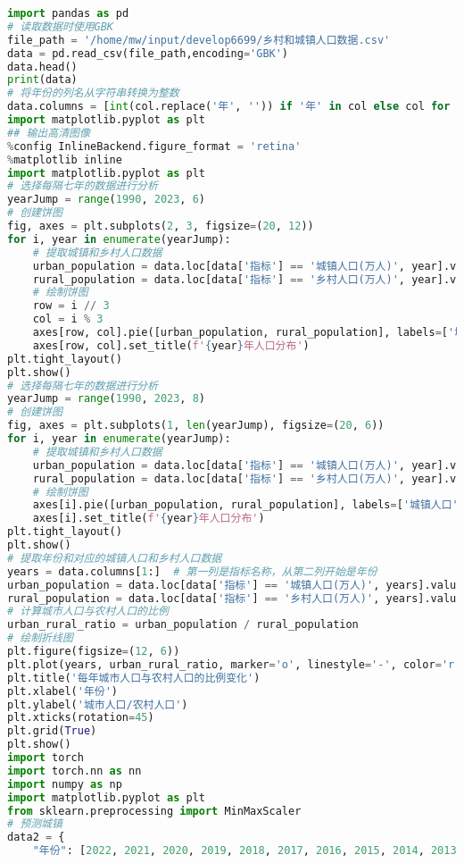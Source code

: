 \begin{lstlisting}[language=python,caption={城乡人口}]
import pandas as pd
# 读取数据时使用GBK
file_path = '/home/mw/input/develop6699/乡村和城镇人口数据.csv'
data = pd.read_csv(file_path,encoding='GBK')
data.head()
print(data)
# 将年份的列名从字符串转换为整数
data.columns = [int(col.replace('年', '')) if '年' in col else col for col in data.columns]
import matplotlib.pyplot as plt
## 输出高清图像
%config InlineBackend.figure_format = 'retina'
%matplotlib inline
import matplotlib.pyplot as plt
# 选择每隔七年的数据进行分析
yearJump = range(1990, 2023, 6)
# 创建饼图
fig, axes = plt.subplots(2, 3, figsize=(20, 12))
for i, year in enumerate(yearJump):
    # 提取城镇和乡村人口数据
    urban_population = data.loc[data['指标'] == '城镇人口(万人)', year].values[0]
    rural_population = data.loc[data['指标'] == '乡村人口(万人)', year].values[0]
    # 绘制饼图
    row = i // 3
    col = i % 3
    axes[row, col].pie([urban_population, rural_population], labels=['城镇人口', '乡村人口'], autopct='%1.1f%%')
    axes[row, col].set_title(f'{year}年人口分布')
plt.tight_layout()
plt.show()
# 选择每隔七年的数据进行分析
yearJump = range(1990, 2023, 8)
# 创建饼图
fig, axes = plt.subplots(1, len(yearJump), figsize=(20, 6))
for i, year in enumerate(yearJump):
    # 提取城镇和乡村人口数据
    urban_population = data.loc[data['指标'] == '城镇人口(万人)', year].values[0]
    rural_population = data.loc[data['指标'] == '乡村人口(万人)', year].values[0]
    # 绘制饼图
    axes[i].pie([urban_population, rural_population], labels=['城镇人口', '乡村人口'], autopct='%1.1f%%')
    axes[i].set_title(f'{year}年人口分布')
plt.tight_layout()
plt.show()
# 提取年份和对应的城镇人口和乡村人口数据
years = data.columns[1:]  # 第一列是指标名称，从第二列开始是年份
urban_population = data.loc[data['指标'] == '城镇人口(万人)', years].values.flatten()
rural_population = data.loc[data['指标'] == '乡村人口(万人)', years].values.flatten()
# 计算城市人口与农村人口的比例
urban_rural_ratio = urban_population / rural_population
# 绘制折线图
plt.figure(figsize=(12, 6))
plt.plot(years, urban_rural_ratio, marker='o', linestyle='-', color='r')
plt.title('每年城市人口与农村人口的比例变化')
plt.xlabel('年份')
plt.ylabel('城市人口/农村人口')
plt.xticks(rotation=45)
plt.grid(True)
plt.show()
import torch
import torch.nn as nn
import numpy as np
import matplotlib.pyplot as plt
from sklearn.preprocessing import MinMaxScaler
# 预测城镇
data2 = {
    "年份": [2022, 2021, 2020, 2019, 2018, 2017, 2016, 2015, 2014, 2013, 2012, 2011, 2010, 2009, 2008, 2007, 2006, 2005, 2004, 2003, 2002, 2001, 2000, 1999, 1998, 1997, 1996, 1995, 1994, 1993, 1992, 1991, 1990],

\end{lstlisting}
